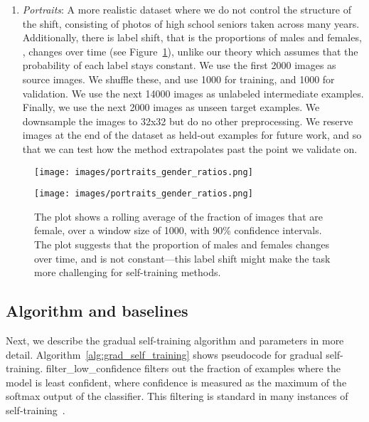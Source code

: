 \documentclass[11pt]{article}
\begin{document}
\begin{enumerate}
\item \emph{Portraits}: A more realistic dataset where we do not control the structure of the shift, consisting of photos of high school seniors taken across many years. Additionally, there is label shift, that is the proportions of males and females, , changes over time (see Figure~\ref{fig:portraits_gender_ratios}), unlike our theory which assumes that the probability of each label stays constant. We use the first 2000 images as source images. We shuffle these, and use 1000 for training, and 1000 for validation. We use the next 14000 images as unlabeled intermediate examples. Finally, we use the next 2000 images as unseen target examples. We downsample the images to 32x32 but do no other preprocessing. We reserve images at the end of the dataset as held-out examples for future work, and so that we can test how the method extrapolates past the point we validate on.
\end{enumerate}


\begin{figure}[t]
\begin{center}
\ifdefined\usearxivstyle
\centerline{\texttt{[image: images/portraits\_gender\_ratios.png]}}
\else
\centerline{\texttt{[image: images/portraits\_gender\_ratios.png]}}
\fi
\caption{The plot shows a rolling average of the fraction of images that are female, over a window size of 1000, with 90\% confidence intervals. The plot suggests that the proportion of males and females changes over time, and is not constant---this label shift might make the task more challenging for self-training methods.}
\label{fig:portraits_gender_ratios}
\end{center}
\vskip -0.3in
\end{figure}

\subsection{Algorithm and baselines}

Next, we describe the gradual self-training algorithm and parameters in more detail.
Algorithm~\ref{alg:grad_self_training} shows pseudocode for gradual self-training.
filter\_low\_confidence filters out the  fraction of examples where the model is least confident, where confidence is measured as the maximum of the softmax output of the classifier.
This filtering is standard in many instances of self-training~\cite{xie2020selftraining}.
\end{document}
